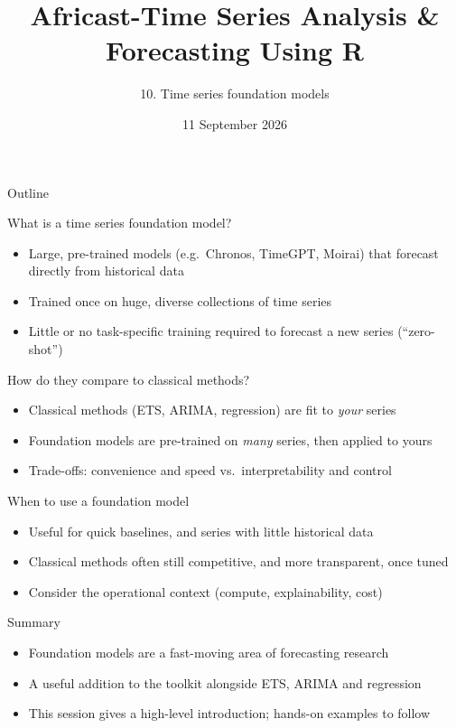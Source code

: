 \documentclass[
  14pt,
  ignorenonframetext,
  aspectratio=169,
]{beamer}
\title{\texorpdfstring{Africast-Time Series Analysis \& Forecasting
Using R}{Africast-Time Series Analysis \& Forecasting Using R}}
\subtitle{\texorpdfstring{10. Time series foundation
models}{10. Time series foundation models}}
\author{}
\date{11 September 2026}
\providecommand{\tightlist}{%
  \setlength{\itemsep}{0pt}\setlength{\parskip}{0pt}}
\begin{document}
\frame{\titlepage}


\begin{frame}
\end{frame}

\begin{frame}{Outline}
\protect{}\label{outline}
\vspace*{0.7cm}\tableofcontents
\end{frame}

\begin{frame}{What is a time series foundation model?}
\protect{}\label{what-is-a-time-series-foundation-model}
\begin{itemize}
\tightlist
\item
  Large, pre-trained models (e.g.~Chronos, TimeGPT, Moirai) that
  forecast directly from historical data
\item
  Trained once on huge, diverse collections of time series
\item
  Little or no task-specific training required to forecast a new series
  (``zero-shot'')
\end{itemize}
\end{frame}

\begin{frame}{How do they compare to classical methods?}
\protect{}\label{how-do-they-compare-to-classical-methods}
\begin{itemize}
\tightlist
\item
  Classical methods (ETS, ARIMA, regression) are fit to \emph{your}
  series
\item
  Foundation models are pre-trained on \emph{many} series, then applied
  to yours
\item
  Trade-offs: convenience and speed vs.~interpretability and control
\end{itemize}
\end{frame}

\begin{frame}{When to use a foundation model}
\protect{}\label{when-to-use-a-foundation-model}
\begin{itemize}
\tightlist
\item
  Useful for quick baselines, and series with little historical data
\item
  Classical methods often still competitive, and more transparent, once
  tuned
\item
  Consider the operational context (compute, explainability, cost)
\end{itemize}
\end{frame}

\begin{frame}{Summary}
\protect{}\label{summary}
\begin{itemize}
\tightlist
\item
  Foundation models are a fast-moving area of forecasting research
\item
  A useful addition to the toolkit alongside ETS, ARIMA and regression
\item
  This session gives a high-level introduction; hands-on examples to
  follow
\end{itemize}
\end{frame}
\end{document}
